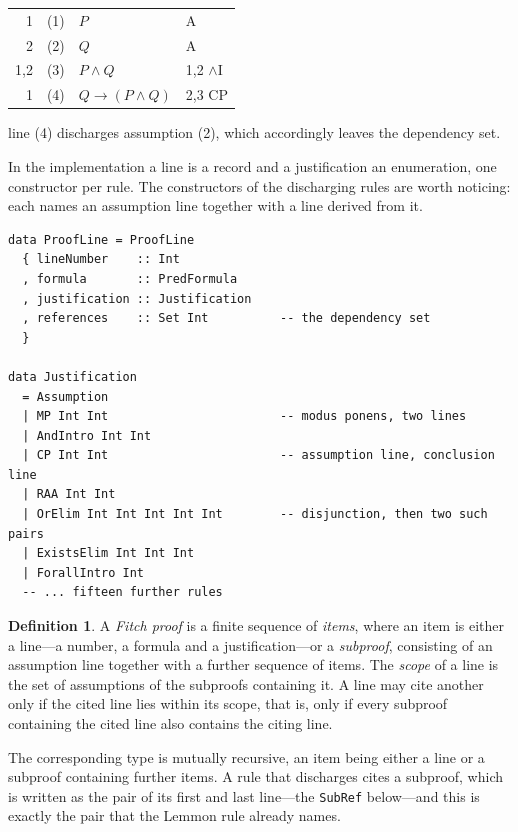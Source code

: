 \documentclass[11pt]{article}
\makeatletter
\theoremstyle{plain}
\theoremstyle{definition}
\newtheorem{definition}[theorem]{Definition}
\theoremstyle{remark}
\newcommand{\dep}[1]{\textup{#1}}
\newenvironment{lemmonproof}
  {\begin{center}\begin{tabular}{@{}r@{\hspace{1.5em}}r@{\hspace{0.6em}}l@{\hspace{2.5em}}l@{}}}
  {\end{tabular}\end{center}}
\makeatother
\begin{document}
\begin{lemmonproof}
\dep{1}   & (1) & $P$              & A \\
\dep{2}   & (2) & $Q$              & A \\
\dep{1,2} & (3) & $P \wedge Q$     & 1,2 $\wedge$I \\
\dep{1}   & (4) & $Q \to (P \wedge Q)$ & 2,3 CP \\
\end{lemmonproof}

\noindent line (4) discharges assumption (2), which accordingly leaves the
dependency set.

In the implementation a line is a record and a justification an enumeration,
one constructor per rule. The constructors of the discharging rules are worth
noticing: each names an assumption line together with a line derived from it.

\begin{lstlisting}
data ProofLine = ProofLine
  { lineNumber    :: Int
  , formula       :: PredFormula
  , justification :: Justification
  , references    :: Set Int          -- the dependency set
  }

data Justification
  = Assumption
  | MP Int Int                        -- modus ponens, two lines
  | AndIntro Int Int
  | CP Int Int                        -- assumption line, conclusion line
  | RAA Int Int
  | OrElim Int Int Int Int Int        -- disjunction, then two such pairs
  | ExistsElim Int Int Int
  | ForallIntro Int
  -- ... fifteen further rules
\end{lstlisting}

\begin{definition}\label{def:fitch}
A \emph{Fitch proof} is a finite sequence of \emph{items}, where an item is
either a line---a number, a formula and a justification---or a
\emph{subproof}, consisting of an assumption line together with a further
sequence of items. The \emph{scope} of a line is the set of assumptions of the
subproofs containing it. A line may cite another only if the cited line lies
within its scope, that is, only if every subproof containing the cited line
also contains the citing line.
\end{definition}

The corresponding type is mutually recursive, an item being either a line or
a subproof containing further items. A rule that discharges cites a subproof,
which is written as the pair of its first and last line---the \verb|SubRef|
below---and this is exactly the pair that the Lemmon rule already names.
\end{document}
